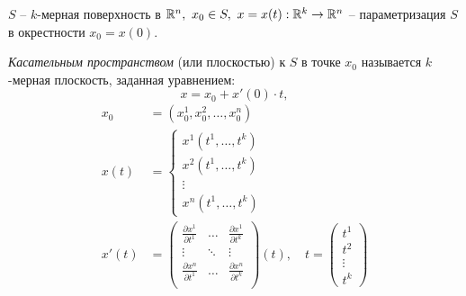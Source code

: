 \begin{definition}
    $ S $ -- $ k $-мерная поверхность в $ \mathbb{R}^n, \ x_0 \in S, \ x = x(t):\mathbb{R}^k \rightarrow \mathbb{R}^n $ -- параметризация $ S $ в окрестности $ x_0 = x(0) $.

    \emph{Касательным пространством} (или плоскостью) к $S$ в точке $x_0$ называется $k$-мерная плоскость, заданная уравнением:
    \begin{equation}\label{eq:8}
        x = x_0 + x'(0) \cdot t,
    \end{equation}
    \begin{align*}
        x_0   & = (x^1_0,x^2_0,\ldots,x^n_0)                                                           \\
        x(t)  & = \left\{\begin{array}{l}
                             x^1(t^1,\ldots,t^k) \\
                             x^2(t^1,\ldots,t^k) \\
                             \vdots              \\
                             x^n(t^1,\ldots,t^k)
                         \end{array}\right.                                                           \\
        x'(t) & = \left(\begin{matrix}
                                \frac{\partial x^1}{\partial t^1} & \ldots & \frac{\partial x^1}{\partial t^k} \\
                                \vdots                            & \ddots & \vdots                            \\
                                \frac{\partial x^n}{\partial t^1} & \ldots & \frac{\partial x^n}{\partial t^k} \\
                            \end{matrix}\right)(t), \quad t = \left(\begin{matrix}
                                                                        t^1 \\ t^2 \\ \vdots \\ t^k
                                                                    \end{matrix}\right)
    \end{align*}


\end{definition}
